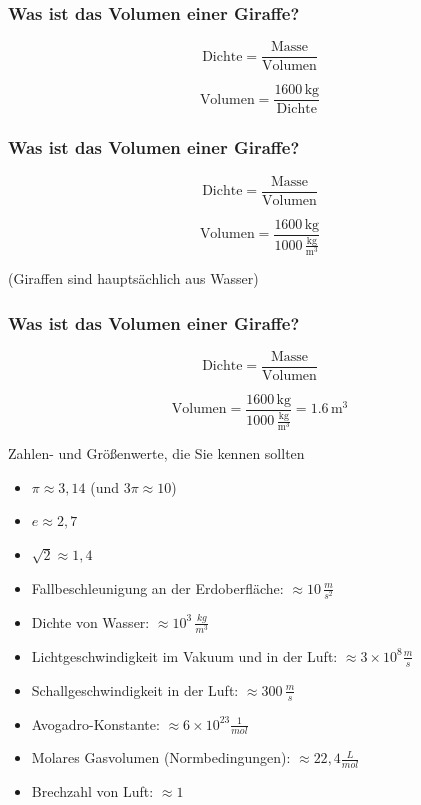 \documentclass{beamer}
\begin{document}
\begin{frame}
\frametitle{Was ist das Volumen einer Giraffe?}


\[ 
\text{Dichte}  = \frac{\text{Masse}}{\text{Volumen}}
\]
 
\[
\text{Volumen} =  \frac{1600\,\text{kg}}{\text{Dichte}} 
\]



\end{frame}


\begin{frame}
\frametitle{Was ist das Volumen einer Giraffe?}


\[ 
\text{Dichte}  = \frac{\text{Masse}}{\text{Volumen}}
\]
 
\[
\text{Volumen} =  \frac{1600\,\text{kg}}{1000\,\frac{\text{kg}}{\text{m}^3}} 
\]


\pause

(Giraffen sind hauptsächlich aus Wasser)


\end{frame}


\begin{frame}
\frametitle{Was ist das Volumen einer Giraffe?}


\[ 
\text{Dichte}  = \frac{\text{Masse}}{\text{Volumen}}
\]
 
\[
\text{Volumen} =  \frac{1600\,\text{kg}}{1000\,\frac{\text{kg}}{\text{m}^3}} =    1.6\,\text{m}^3
\]


\end{frame}

 

\begin{frame}{Zahlen- und Größenwerte, die Sie kennen sollten}

\begin{itemize}
\item
\(\pi \approx 3,14 \) (und \(3\pi \approx 10\))
\item
\(e\approx 2,7\)
\item
\(\sqrt{2} \approx 1,4\)
\item
Fallbeschleunigung an der Erdoberfläche: \(\approx 10\,\frac{m}{s^2}\)
\item
Dichte von Wasser: \(\approx 10^3\,\frac{kg}{m^3}\)
\item
Lichtgeschwindigkeit im Vakuum und in der Luft: \(\approx 3\times 10^8 \frac{m}{s}\) 
\item
Schallgeschwindigkeit in der Luft: \(\approx 300\,\frac{m}{s}\)
\item
Avogadro-Konstante: \(\approx 6\times 10^{23} \frac{1}{mol}\)
\item
Molares Gasvolumen (Normbedingungen): \(\approx 22,4 \frac{L}{mol}\)
\item
Brechzahl von Luft: \(\approx 1\)
\end{itemize}


\end{frame}
\end{document}
